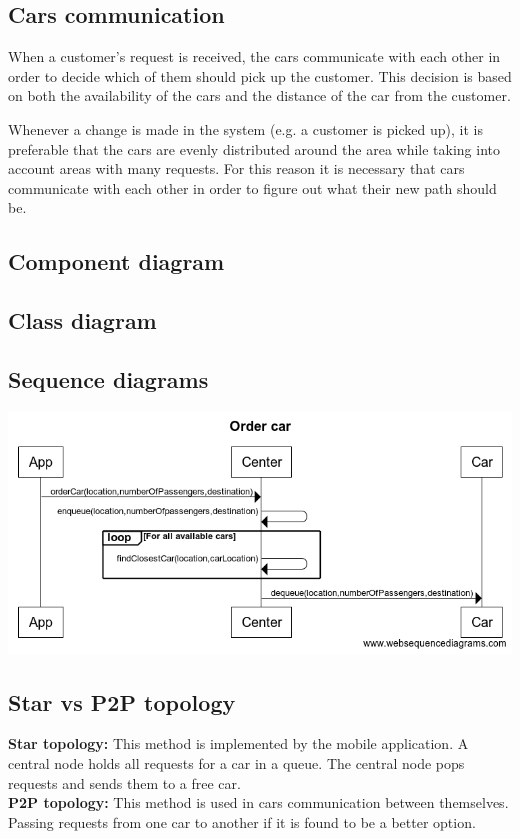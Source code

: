 \documentclass[a4paper]{article}
\begin{document}
\subsection*{Cars communication}
When a customer's request is received, the cars communicate with each other in order to decide which of them should pick up the customer. This decision is based on both the availability of the cars and the distance of the car from the customer.

Whenever a change is made in the system (e.g. a customer is picked up), it is preferable that the cars are evenly distributed around the area while taking into account areas with many requests. For this reason it is necessary that cars communicate with each other in order to figure out what their new path should be.
\subsection*{Component diagram}

\subsection*{Class diagram}

\subsection*{Sequence diagrams}
\includegraphics[width=1\textwidth]{sd1.png}

\subsection*{Star vs P2P topology}
\textbf{Star topology:} This method is implemented by the mobile application. A central node holds all requests for a car in a queue. The central node pops requests and sends them to a free car.
\\\textbf{P2P topology:} This method is used in cars communication between themselves. Passing requests from one car to another if it is found to be a better option.
\end{document}
